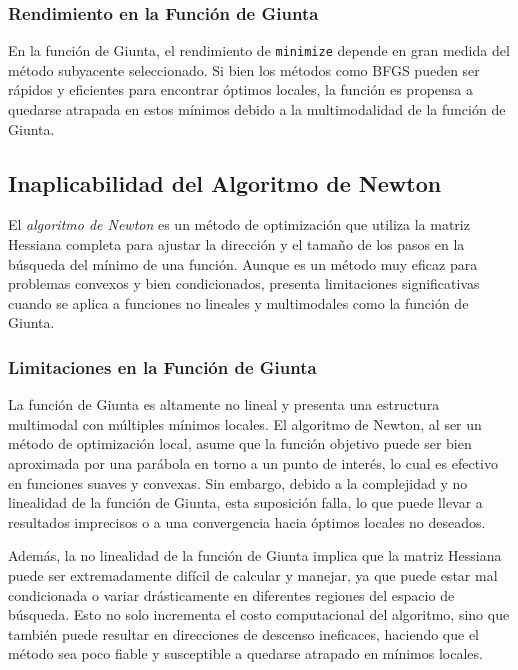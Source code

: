 \documentclass[fontsize=10pt]{article}
\begin{document}
\subsubsection{Rendimiento en la Función de Giunta}

En la función de Giunta, el rendimiento de \texttt{minimize} depende en gran medida del método subyacente seleccionado. Si bien los métodos como BFGS pueden ser rápidos y eficientes para encontrar óptimos locales, la función es propensa a quedarse atrapada en estos mínimos debido a la multimodalidad de la función de Giunta.

\subsection{Inaplicabilidad del Algoritmo de Newton}

El \textit{algoritmo de Newton} es un método de optimización que utiliza la matriz Hessiana completa para ajustar la dirección y el tamaño de los pasos en la búsqueda del mínimo de una función. Aunque es un método muy eficaz para problemas convexos y bien condicionados, presenta limitaciones significativas cuando se aplica a funciones no lineales y multimodales como la función de Giunta.

\subsubsection{Limitaciones en la Función de Giunta}

La función de Giunta es altamente no lineal y presenta una estructura multimodal con múltiples mínimos locales. El algoritmo de Newton, al ser un método de optimización local, asume que la función objetivo puede ser bien aproximada por una parábola en torno a un punto de interés, lo cual es efectivo en funciones suaves y convexas. Sin embargo, debido a la complejidad y no linealidad de la función de Giunta, esta suposición falla, lo que puede llevar a resultados imprecisos o a una convergencia hacia óptimos locales no deseados.

Además, la no linealidad de la función de Giunta implica que la matriz Hessiana puede ser extremadamente difícil de calcular y manejar, ya que puede estar mal condicionada o variar drásticamente en diferentes regiones del espacio de búsqueda. Esto no solo incrementa el costo computacional del algoritmo, sino que también puede resultar en direcciones de descenso ineficaces, haciendo que el método sea poco fiable y susceptible a quedarse atrapado en mínimos locales.
\end{document}
